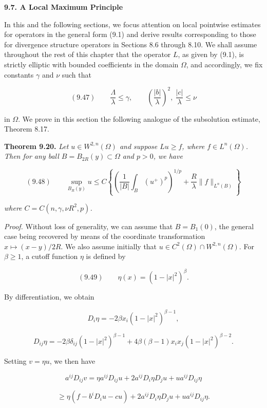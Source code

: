 \begin{center}
\textbf{9.7. A Local Maximum Principle}
\end{center}

In this and the following sections, we focus attention on local pointwise estimates for operators in the general form (9.1) and derive results corresponding to those for divergence structure operators in Sections 8.6 through 8.10. We shall assume throughout the rest of this chapter that the operator $L$, as given by (9.1), is strictly elliptic with bounded coefficients in the domain $\Omega$, and accordingly, we fix constants $\gamma$ and $\nu$ such that

\[
(9.47)\qquad \frac{\Lambda}{\lambda} \le \gamma,\qquad \left(\frac{|b|}{\lambda}\right)^2,\ \frac{|c|}{\lambda} \le \nu
\]

in $\Omega$. We prove in this section the following analogue of the subsolution estimate, Theorem 8.17.

\textbf{Theorem 9.20.} \textit{Let $u \in W^{2,n}(\Omega)$ and suppose $Lu \ge f$, where $f \in L^n(\Omega)$. Then for any ball $B = B_{2R}(y) \subset \Omega$ and $p > 0$, we have}

\[
(9.48)\qquad \sup_{B_R(y)} u \le C\left\{\left(\frac{1}{|B|}\int_B (u^+)^p\right)^{1/p} + \frac{R}{\lambda}\|f\|_{L^n(B)}\right\}
\]

\textit{where $C = C(n,\gamma,\nu R^2,p)$.}

\textit{Proof.} Without loss of generality, we can assume that $B = B_1(0)$, the general case being recovered by means of the coordinate transformation $x \mapsto (x - y)/2R$. We also assume initially that $u \in C^2(\Omega) \cap W^{2,n}(\Omega)$. For $\beta \ge 1$, a cutoff function $\eta$ is defined by

\[
(9.49)\qquad \eta(x) = (1 - |x|^2)^\beta.
\]

By differentiation, we obtain

\[
D_i\eta = -2\beta x_i(1 - |x|^2)^{\beta - 1},
\]

\[
D_{ij}\eta = -2\beta\delta_{ij}(1 - |x|^2)^{\beta - 1} + 4\beta(\beta - 1)x_i x_j(1 - |x|^2)^{\beta - 2}.
\]

Setting $v = \eta u$, we then have

\[
a^{ij}D_{ij}v = \eta a^{ij}D_{ij}u + 2a^{ij}D_i\eta D_j u + ua^{ij}D_{ij}\eta
\]

\[
\ge \eta(f - b^iD_iu - cu) + 2a^{ij}D_i\eta D_j u + ua^{ij}D_{ij}\eta.
\]


